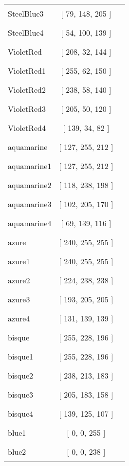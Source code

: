 \begin{tabular}{|l|c|c|}
SteelBlue3 & [ 79, 148, 205 ] & \color{SteelBlue3} \rule{1cm}{1.5ex}\\
SteelBlue4 & [ 54, 100, 139 ] & \color{SteelBlue4} \rule{1cm}{1.5ex}\\
VioletRed & [ 208, 32, 144 ] & \color{VioletRed} \rule{1cm}{1.5ex}\\
VioletRed1 & [ 255, 62, 150 ] & \color{VioletRed1} \rule{1cm}{1.5ex}\\
VioletRed2 & [ 238, 58, 140 ] & \color{VioletRed2} \rule{1cm}{1.5ex}\\
VioletRed3 & [ 205, 50, 120 ] & \color{VioletRed3} \rule{1cm}{1.5ex}\\
VioletRed4 & [ 139, 34, 82 ] & \color{VioletRed4} \rule{1cm}{1.5ex}\\
aquamarine & [ 127, 255, 212 ] & \color{aquamarine} \rule{1cm}{1.5ex}\\
aquamarine1 & [ 127, 255, 212 ] & \color{aquamarine1} \rule{1cm}{1.5ex}\\
aquamarine2 & [ 118, 238, 198 ] & \color{aquamarine2} \rule{1cm}{1.5ex}\\
aquamarine3 & [ 102, 205, 170 ] & \color{aquamarine3} \rule{1cm}{1.5ex}\\
aquamarine4 & [ 69, 139, 116 ] & \color{aquamarine4} \rule{1cm}{1.5ex}\\
azure & [ 240, 255, 255 ] & \color{azure} \rule{1cm}{1.5ex}\\
azure1 & [ 240, 255, 255 ] & \color{azure1} \rule{1cm}{1.5ex}\\
azure2 & [ 224, 238, 238 ] & \color{azure2} \rule{1cm}{1.5ex}\\
azure3 & [ 193, 205, 205 ] & \color{azure3} \rule{1cm}{1.5ex}\\
azure4 & [ 131, 139, 139 ] & \color{azure4} \rule{1cm}{1.5ex}\\
bisque & [ 255, 228, 196 ] & \color{bisque} \rule{1cm}{1.5ex}\\
bisque1 & [ 255, 228, 196 ] & \color{bisque1} \rule{1cm}{1.5ex}\\
bisque2 & [ 238, 213, 183 ] & \color{bisque2} \rule{1cm}{1.5ex}\\
bisque3 & [ 205, 183, 158 ] & \color{bisque3} \rule{1cm}{1.5ex}\\
bisque4 & [ 139, 125, 107 ] & \color{bisque4} \rule{1cm}{1.5ex}\\
blue1 & [ 0, 0, 255 ] & \color{blue1} \rule{1cm}{1.5ex}\\
blue2 & [ 0, 0, 238 ] & \color{blue2} \rule{1cm}{1.5ex}\\

\end{tabular}
